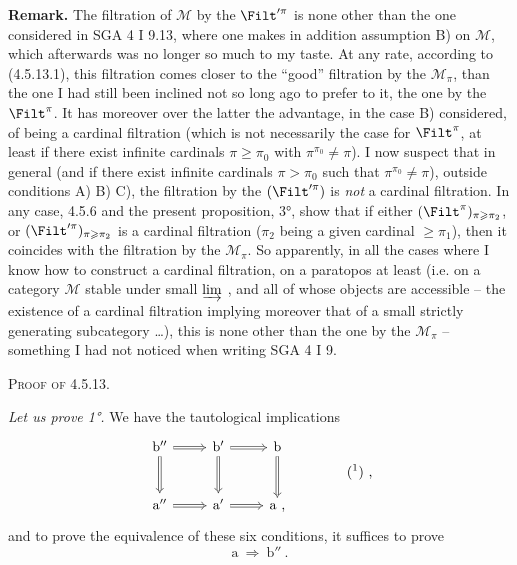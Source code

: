 \textbf{Remark.} The filtration of $\mathcal{M}$ by the $\Filt'^{\pi}$ is none other than the one considered in SGA 4 I 9.13, where one makes in addition assumption B) on $\mathcal{M}$, which afterwards was no longer so much to my taste. At any rate, according to (4.5.13.1), this filtration comes closer to the ``good'' filtration by the $\mathcal{M}_{\pi}$, than the one I had still been inclined not so long ago to prefer to it, the one by the $\Filt^{\pi}$. It has moreover over the latter the advantage, in the case B) considered, of being a cardinal filtration (which is not necessarily the case for $\Filt^{\pi}$, at least if there exist infinite cardinals $\pi \geqslant \pi_0$ with $\pi^{\pi_0} \neq \pi$). I now suspect that in general (and if there exist infinite cardinals $\pi > \pi_0$ such that $\pi^{\pi_0} \neq \pi$), outside conditions A) B) C), the filtration by the $(\Filt'^{\pi})$ is \textit{not} a
cardinal filtration. In any case, 4.5.6 and the present proposition, 3°, show that if either $(\Filt^{\pi})_{\pi\geqslant\pi_2}$, or $(\Filt'^{\pi})_{\pi\geqslant\pi_2}$ is a cardinal filtration ($\pi_2$ being a given cardinal $\geqslant \pi_1$), then it coincides with the filtration by the $\mathcal{M}_{\pi}$. So apparently, in all the cases where I know how to construct a cardinal filtration, on a paratopos at least (i.e. on a category $\mathcal{M}$ stable under small $\varinjlim$ , and all of whose objects are accessible -- the existence of a cardinal filtration implying moreover that of a small strictly generating subcategory \dots), this is none other than the one by the $\mathcal{M}_{\pi}$ -- something I had not noticed when writing SGA 4 I 9. %

\textsc{Proof of 4.5.13.}

\textit{Let us prove 1°.} We have the tautological implications
\[
\begin{tikzcd}[row sep=large]
\mathrm{b}'' \arrow[r, Rightarrow] \arrow[d, Rightarrow] & \mathrm{b}' \arrow[r, Rightarrow] \arrow[d, Rightarrow] & \mathrm{b} \arrow[d, Rightarrow] \\
\mathrm{a}'' \arrow[r, Rightarrow] & \mathrm{a}' \arrow[r, Rightarrow] & \mathrm{a} \text{ ,}
\end{tikzcd}
\qquad\qquad \text{(\footnotemark) ,}
\]
and to prove the equivalence of these six conditions, it suffices to prove
\[ \mathrm{a} \ \Longrightarrow \ \mathrm{b}'' \ . \]

